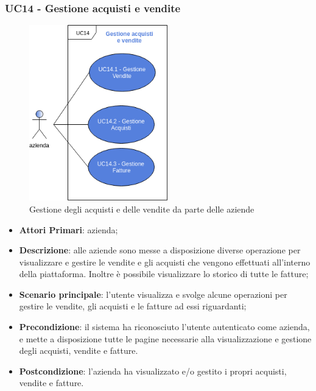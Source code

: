 \subsubsection{UC14 - Gestione acquisti e vendite}
\begin{figure}[h]
	\includegraphics[width=6cm]{res/images/UC14-Generale.png}
	\centering
	\caption{Gestione degli acquisti e delle vendite da parte delle aziende}
\end{figure}
\begin{itemize}
	\item \textbf{Attori Primari}: azienda;
	\item \textbf{Descrizione}: alle aziende sono messe a disposizione diverse operazione per visualizzare e gestire le vendite e gli acquisti che vengono effettuati all'interno della piattaforma. Inoltre è possibile visualizzare lo storico di tutte le fatture;
	\item \textbf{Scenario principale}: l'utente visualizza e svolge alcune operazioni per gestire le vendite, gli acquisti e le fatture ad essi riguardanti;
	\item \textbf{Precondizione}: il sistema ha riconosciuto l'utente autenticato come azienda, e mette a disposizione tutte le pagine necessarie alla visualizzazione e gestione degli acquisti, vendite e fatture.
	\item \textbf{Postcondizione}: l'azienda ha visualizzato e/o gestito i propri acquisti, vendite e fatture.
\end{itemize} 
